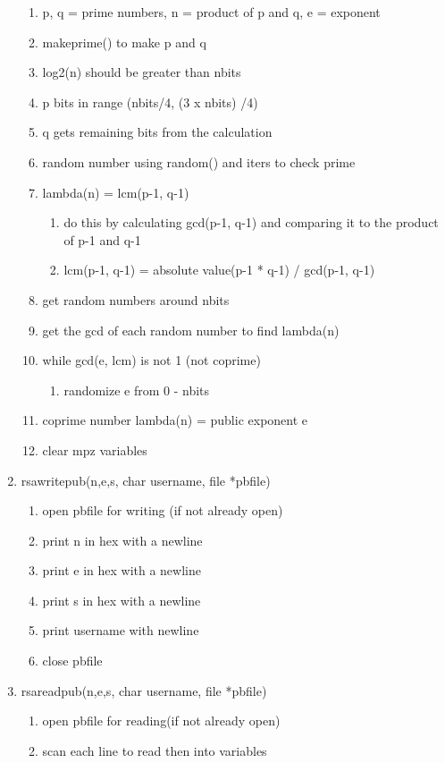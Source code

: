 \documentclass[11pt]{article}
\begin{document}
\begin{enumerate}
\begin{enumerate}
	\item p, q = prime numbers, n = product of p and q, e = exponent
	\item makeprime() to make p and q
	\item log2(n) should be greater than nbits
	\item p bits in range (nbits/4, (3 x nbits) /4)
	\item q gets remaining bits from the calculation
	\item random number using random() and iters to check prime
	\item lambda(n) = lcm(p-1, q-1)
		\begin{enumerate}
		\item do this by calculating gcd(p-1, q-1) and comparing it to the product of p-1 and q-1
		\item lcm(p-1, q-1) = absolute value(p-1 * q-1) / gcd(p-1, q-1)
		\end{enumerate}
	\item get random numbers around nbits
	\item get the gcd of each random number to find lambda(n)
	\item while gcd(e, lcm) is not 1 (not coprime)
		\begin{enumerate}
		\item randomize e from 0 - nbits
		\end{enumerate}
	\item coprime number lambda(n) = public exponent e
	\item clear mpz variables
	\end{enumerate}
\item rsawritepub(n,e,s, char username, file *pbfile)
	\begin{enumerate}
	\item open pbfile for writing (if not already open)
	\item print n in hex with a newline
	\item print e in hex with a newline
	\item print s in hex with a newline
	\item print username with newline
	\item close pbfile
	\end{enumerate}
\item rsareadpub(n,e,s, char username, file *pbfile)
	\begin{enumerate}
	\item open pbfile for reading(if not already open)
	\item scan each line to read then into variables

\end{enumerate}
\end{enumerate}
\end{document}
